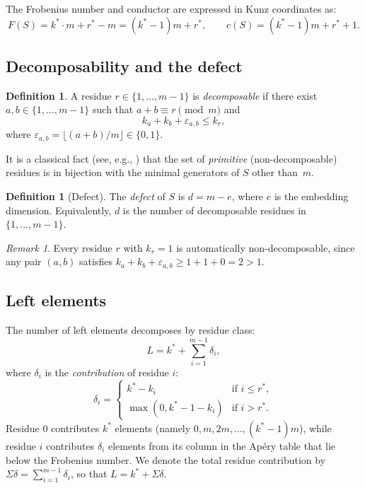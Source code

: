 \documentclass[11pt]{amsart}
\theoremstyle{definition}
\newtheorem{definition}[theorem]{Definition}
\theoremstyle{remark}
\newtheorem{remark}[theorem]{Remark}
\begin{document}
The Frobenius number and conductor are expressed in Kunz coordinates as:
\begin{equation}\label{eq:conductor}
  F(S) = k^* \cdot m + r^* - m = (k^* - 1)m + r^*, \qquad
  c(S) = (k^* - 1)m + r^* + 1.
\end{equation}

\subsection{Decomposability and the defect}

\begin{definition}\label{def:decomposable}
A residue $r \in \{1, \ldots, m-1\}$ is \emph{decomposable} if there exist
$a, b \in \{1, \ldots, m-1\}$ such that $a + b \equiv r \pmod{m}$ and
\begin{equation}\label{eq:decomp}
  k_a + k_b + \varepsilon_{a,b} \le k_r,
\end{equation}
where $\varepsilon_{a,b} = \lfloor (a + b)/m \rfloor \in \{0, 1\}$.
\end{definition}

It is a classical fact (see, e.g., \cite{Eliahou2020}) that the set of
\emph{primitive} (non-decomposable) residues is in bijection with the minimal
generators of $S$ other than~$m$.

\begin{definition}[Defect]\label{def:defect}
The \emph{defect} of $S$ is $d = m - e$, where $e$ is the embedding dimension.
Equivalently, $d$ is the number of decomposable residues in
$\{1, \ldots, m-1\}$.
\end{definition}

\begin{remark}\label{rem:level1}
Every residue $r$ with $k_r = 1$ is automatically non-decomposable, since
any pair $(a, b)$ satisfies $k_a + k_b + \varepsilon_{a,b} \ge 1 + 1 + 0 = 2 > 1$.
\end{remark}

\subsection{Left elements}

The number of left elements decomposes by residue class:
\begin{equation}\label{eq:L-decomp}
  L = k^* + \sum_{i=1}^{m-1} \delta_i,
\end{equation}
where $\delta_i$ is the \emph{contribution} of residue $i$:
\begin{equation}\label{eq:delta}
  \delta_i =
  \begin{cases}
    k^* - k_i & \text{if } i \le r^*, \\
    \max(0, k^* - 1 - k_i) & \text{if } i > r^*.
  \end{cases}
\end{equation}
Residue $0$ contributes $k^*$ elements (namely $0, m, 2m, \ldots, (k^*-1)m$),
while residue $i$ contributes $\delta_i$ elements from its column in the
Ap\'ery table that lie below the Frobenius number.
We denote the total residue contribution by $\Sigma\delta = \sum_{i=1}^{m-1} \delta_i$,
so that $L = k^* + \Sigma\delta$.
\end{document}
